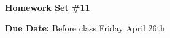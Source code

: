 


\thispagestyle{fancy}






\begin{center}
{\huge \textbf{Homework Set \#11 }}
\large

{\textbf{ Due Date:} Before class Friday April 26th  } 
\end{center}

